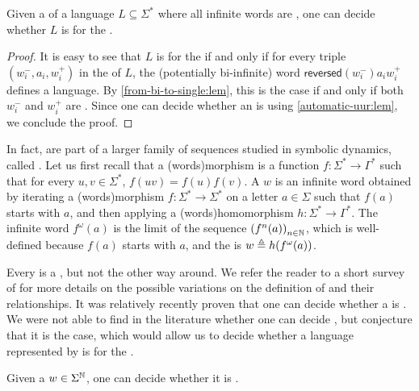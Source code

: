\begin{theorem}
    \label{automatic-wqo:thm}
    Given a  of a language $L \subseteq
    \Sigma^*$ where all infinite words are , one can
    decide whether $L$ is  for the .
\end{theorem}
\begin{proof}
    It is easy to see that $L$ is  for the  if and only if for every triple $(w_i^-, a_i, w_i^+)$ in the
     of $L$, the (potentially bi-infinite) word
    $\mathsf{reversed}(w_i^-) a_i w_i^+$ defines a 
    language. By \cref{from-bi-to-single:lem}, this is the case if and only if
    both $w_i^-$ and $w_i^+$ are . 
    Since one can decide whether an  is
     using \cref{automatic-uur:lem},
    we conclude the proof.
\end{proof}


\AP In fact,  are part of a larger family of sequences
studied in symbolic dynamics, called . Let us first
recall that a \intro(words){morphism} is a function $f \colon \Sigma^* \to
\Gamma^*$ such that for every $u,v \in \Sigma^*$, $f(uv) = f(u)f(v)$. A
 $w$ is an infinite word obtained by iterating a
\kl(words){morphism} $f \colon \Sigma^* \to \Sigma^*$ on a letter $a \in
\Sigma$ such that $f(a)$ starts with $a$, and then applying a
\kl(words){homomorphism} $h \colon \Sigma^* \to \Gamma^*$. The infinite word
$f^\omega(a)$ is the limit of the sequence $\seqof{f^n(a)}[n \in \Nat]$, which
is well-defined because $f(a)$ starts with $a$, and the 
is $ w \triangleq h(f^\omega(a))$. 

\AP
Every  is a , but not the other way around. We refer
the reader to a short survey of \cite{ALSZ17} for more details on the possible
variations on the definition of  and their relationships.
It was relatively recently proven that one can decide whether a  is  \cite[Theorem 1]{DURAND13}. We were not
able to find in the literature whether one can decide , but conjecture that it is the case, which would allow us to
decide whether a language represented by  is
 for the .

\begin{conjecture}
  \label{morphic-uur:conj}
    Given a  $w \in \Sigma^{\mathbb{N}}$, one can decide
    whether it is .
\end{conjecture}
